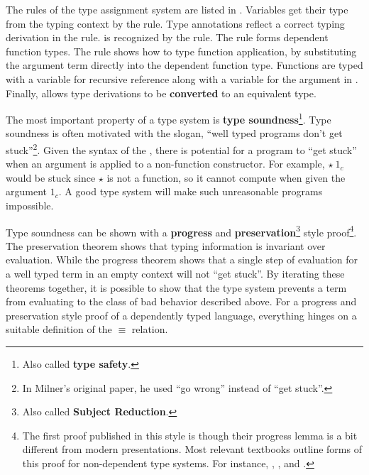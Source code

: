 The rules of the type assignment system are listed in .
Variables get their type from the typing context by the  rule.
Type annotations reflect a correct typing derivation in the  rule.
\Tit{} is recognized by the  rule.
The  rule forms dependent function types.
The  rule shows how to type function application, by substituting the argument term directly into the dependent function type.
Functions are typed with a variable for recursive reference along with a variable for the argument in .
Finally,  allows type derivations to be \textbf{converted} to an equivalent type.
 
The most important property of a type system is \textbf{type soundness}\footnote{
  Also called \textbf{type safety}.
}.
Type soundness is often motivated with the slogan, ``well typed programs don't get stuck''\cite{MILNER1978348}\footnote{
  In Milner's original paper, he used ``go wrong'' instead of ``get stuck''.
}.
Given the syntax of the \slang{}, there is potential for a program to ``get stuck'' when an argument is applied to a non-function constructor.
For example, $\star\ 1_{c}$ would be stuck since $\star$ is not a function, so it cannot compute when given the argument $1_{c}$.
A good type system will make such unreasonable programs impossible.
 
Type soundness can be shown with a \textbf{progress} and \textbf{preservation}\footnote{
  Also called \textbf{Subject Reduction}.
} style proof\footnote{
  The first proof published in this style is \cite{WRIGHT199438} though their progress lemma is a bit different from modern presentations.
  Most relevant textbooks outline forms of this proof for non-dependent type systems.
  For instance, \cite[Part 2]{pierce2002types}, \cite{KOKKE2020102440}, and \cite[Chapter 11]{chlipala2017formal}.
}. 
The preservation theorem shows that typing information is invariant over evaluation.
While the progress theorem shows that a single step of evaluation for a well typed term in an empty context will not ``get stuck''.
By iterating these theorems together, it is possible to show that the type system prevents a term from evaluating to the class of bad behavior described above.
For a progress and preservation style proof of a dependently typed language, everything hinges on a suitable definition of the $\equiv$ relation.
 

